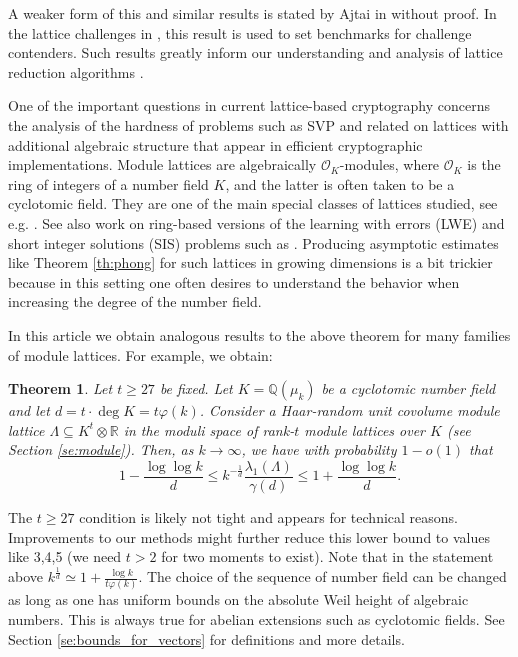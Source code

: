 \documentclass{amsart}
\newtheorem{theorem}{Theorem}
\newcommand{\OK}{\mathcal{O}_K}
\begin{document}
A weaker form of this and similar results is stated by Ajtai in \cite{A02} without proof.
In the lattice challenges in \cite{BLR08}, this result is used to set benchmarks for challenge contenders. Such results greatly inform our understanding and analysis of lattice reduction algorithms \cite{LN20,EK20}. \par

One of the important questions in current lattice-based cryptography concerns the analysis of the hardness of problems such as SVP and related on lattices with additional algebraic structure that appear in efficient cryptographic implementations. Module lattices are algebraically $\OK$-modules, where $\OK$ is the ring of integers of a number field $K$, and the latter is often taken to be a cyclotomic field. They are one of the main special classes of lattices studied, see e.g. \cite{LS15,DMPT23}. See also work on ring-based versions of the learning with errors (LWE) and short integer solutions (SIS) problems such as \cite{RingLWE2010,RingLWE}.
Producing asymptotic estimates like Theorem \ref{th:phong} for such lattices in growing dimensions is a bit trickier because in this setting one often desires to understand the behavior when increasing the degree of the number field.

In this article we obtain analogous results to the above theorem for many families of module lattices. 
For example, we obtain:
\begin{theorem}
	\label{th:as_module_bound}
Let $t \geq 27$ be fixed.
Let $K = \mathbb{Q}(\mu_{k})$ be a cyclotomic number field and let $d = t \cdot \deg K = t \varphi(k)$. 
Consider a Haar-random 
unit covolume
module lattice $\Lambda \subseteq K^{t} \otimes \mathbb{R}$ in the moduli space of rank-$t$ module lattices over $K$ (see Section \ref{se:module}).
Then, as $k \rightarrow \infty$, we have with probability $1- o(1)$ that
\begin{equation}
 1- \frac{\log \log k}{d} \leq k^{-\frac{1}{d}}\frac{\lambda_1(\Lambda)}{\gamma(d)} \leq  1 + \frac{\log \log k}{d}.
 \label{eq:bound}
\end{equation}
\end{theorem}
The $t \geq 27$ condition is likely not tight and appears for technical reasons. Improvements to our methods might further reduce this lower bound to values like 3,4,5 (we need $t > 2$ for two moments to exist). Note that in the statement above $k^\frac{1}{d}  \simeq 1 + \tfrac{\log k}{t\varphi(k)}.$
The choice of the sequence of number field can be changed as long as one has uniform bounds on the absolute Weil height of algebraic numbers. This is always true for abelian extensions such as cyclotomic fields. See Section \ref{se:bounds_for_vectors} for definitions and more details.
\end{document}
